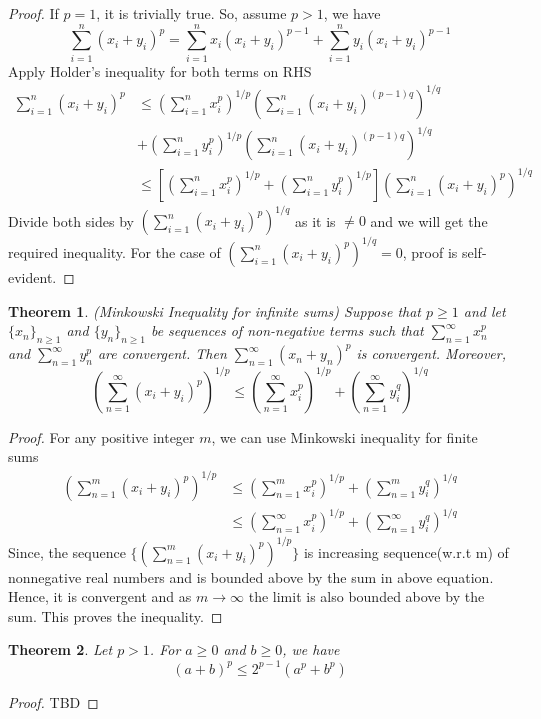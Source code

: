 \documentclass[12pt]{report}
\newtheorem{thm}{Theorem}
\theoremstyle{definition}
\begin{document}
\begin{proof}
    If $p = 1$, it is trivially true. So, assume $p > 1$, we have
    $$ \sum\limits_{i=1}^n(x_i + y_i)^p = \sum\limits_{i=1}^{n} x_i(x_i + y_i)^{p-1} + \sum\limits_{i = 1}^n y_i(x_i + y_i)^{p-1}$$
    Apply Holder's inequality for both terms on RHS
    \begin{align*}
        \sum\limits_{i=1}^n(x_i + y_i)^p &\leq \left(\sum\limits_{i=1}^n x_i^p \right)^{1/p} \left(\sum\limits_{i=1}^n (x_i + y_i)^{(p-1)q}\right)^{1/q} \\
        &+ \left(\sum\limits_{i=1}^n y_i^p \right)^{1/p} \left(\sum\limits_{i=1}^n (x_i + y_i)^{(p-1)q}\right)^{1/q}\\
        &\leq \left[\left(\sum\limits_{i=1}^n x_i^p\right)^{1/p} + \left(\sum\limits_{i=1}^n y_i^p\right)^{1/p}\right] \left(\sum\limits_{i=1}^n(x_i + y_i)^p\right)^{1/q}
    \end{align*}
    Divide both sides by $\left(\sum\limits_{i=1}^n(x_i + y_i)^p\right)^{1/q}$ as it is $\neq 0$ and we will get the required inequality. For the case of $\left(\sum\limits_{i=1}^n(x_i + y_i)^p\right)^{1/q} = 0$, proof is self-evident. 
\end{proof}
\begin{thm}
    (Minkowski Inequality for infinite sums) Suppose that $p \geq 1$ and let $\{x_n\}_{n \geq 1}$ and $\{y_n\}_{n \geq 1}$ be sequences of non-negative terms such that $\sum\limits_{n=1}^{\infty} x_n^p$ and $\sum\limits_{n=1}^{\infty} y_n^p$ are convergent. Then $\sum\limits_{n=1}^{\infty} (x_n + y_n)^p$ is convergent. Moreover,
    $$ \left(\sum\limits_{n =1}^{\infty}(x_i + y_i)^p\right)^{1/p} \leq \left(\sum\limits_{n =1}^{\infty}x_i^p\right)^{1/p} + \left(\sum\limits_{n =1}^{\infty}y_i^q\right)^{1/q} $$
\end{thm}
\begin{proof}
    For any positive integer $m$, we can use Minkowski inequality for finite sums 
    \begin{align*}
        \left(\sum\limits_{n =1}^m(x_i + y_i)^p\right)^{1/p} &\leq \left(\sum\limits_{n =1}^mx_i^p\right)^{1/p} + \left(\sum\limits_{n =1}^my_i^q\right)^{1/q}\\
        &\leq \left(\sum\limits_{n =1}^{\infty}x_i^p\right)^{1/p} + \left(\sum\limits_{n =1}^{\infty}y_i^q\right)^{1/q}
    \end{align*}
    Since, the sequence $\{(\sum\limits_{n =1}^m(x_i + y_i)^p)^{1/p}\}$ is increasing sequence(w.r.t m) of nonnegative real numbers and is bounded above by the sum in above equation. Hence, it is convergent and as $m \to \infty$ the limit is also bounded above by the sum. This proves the inequality.
\end{proof}
\begin{thm} \label{22}
    Let $p > 1$. For $ a \geq 0$ and $ b \geq 0$, we have
    $$ (a + b)^p \leq 2^{p-1}(a^p + b^p)$$
\end{thm}
\begin{proof}
    TBD
\end{proof}
\end{document}
